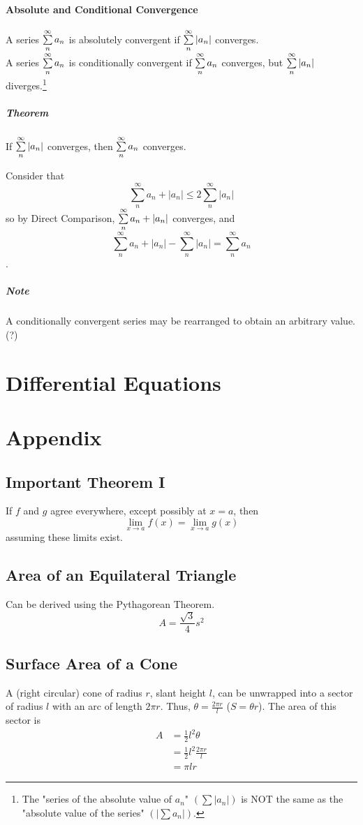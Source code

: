 \documentclass{article}
\begin{document}
\paragraph{Absolute and Conditional Convergence}
A series $\sum_{n}^{\infty}\limits a_n$ is absolutely convergent if $\sum_{n}^{\infty}\limits |a_n|$ converges.\\
A series $\sum_{n}^{\infty}\limits a_n$ is conditionally convergent if $\sum_{n}^{\infty}\limits a_n$ converges, but $\sum_{n}^{\infty}\limits |a_n|$ diverges.\footnote{The "series of the absolute value of $a_n$" $\left(\sum|a_n|\right)$ is NOT the same as the "absolute value of the series" $\left(|\sum a_n|\right)$.}

\subparagraph{Theorem} If $\sum_{n}^{\infty}\limits |a_n|$ converges, then $\sum_{n}^{\infty}\limits a_n$ converges.

Consider that $$\sum_{n}^{\infty}a_n + |a_n| \le 2\sum_{n}^{\infty}|a_n|$$
so by Direct Comparison, $\sum_{n}^{\infty}\limits a_n + |a_n|$ converges, and $$\sum_{n}^{\infty} a_n + |a_n| - \sum_{n}^{\infty} |a_n| = \sum_{n}^{\infty} a_n$$.

\subparagraph{Note} A conditionally convergent series may be rearranged to obtain an arbitrary value. (?)

\section{Differential Equations}

\section{Appendix}
\subsection{Important Theorem I}
If $f$ and $g$ agree everywhere, except possibly at $x=a$, then \[ \lim_{x \to a} f(x) = \lim_{x \to a} g(x) \]
assuming these limits exist.

\subsection{Area of an Equilateral Triangle}
Can be derived using the Pythagorean Theorem.
$$A = \frac{\sqrt{3}}{4}s^2$$

\subsection{Surface Area of a Cone}
A (right circular) cone of radius $r$, slant height $l$, can be unwrapped into a sector of radius $l$ with an arc of length $2 \pi r$. Thus, $\theta = \frac{2\pi r}{l}$ ($S = \theta r$).
The area of this sector is
\begin{align*}
    A & = \frac{1}{2} l^2 \theta  \\
      & = \frac{1}{2}l^2\frac{2\pi r}{l}  \\
      & = \pi lr
\end{align*}
\end{document}
